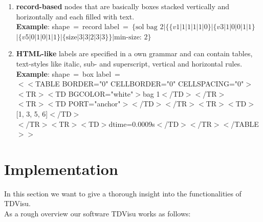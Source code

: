 \documentclass[a4paper, 12pt, bibliography=totoc]{scrartcl}
\begin{document}
\begin{itemize}
\begin{enumerate}[label=(\arabic*)]
		\item \textbf{record-based} nodes that are basically boxes stacked vertically and horizontally and each filled with text.\vspace{10pt}\\
		\textbf{Example}: shape~=~record label~=~$\{\text{sol bag 2}|\{\{v1|1|1|1|1|0\}|\{v3|1|0|0|1|1\}$ \\
		\hspace*{0pt}\hfill $|\{v5|0|1|0|1|1\}|
		\{\text{size}|3|3|2|3|3\}\}|\text{min-size: 2}\}$
		
		\item \textbf{HTML-like} labels are specified in a own grammar and can contain tables, text-styles like italic, sub- and superscript, vertical and horizontal rules.\vspace{10pt}\\		
		\textbf{Example}: shape~=~box label~=\vspace{5pt}\\
		$<<$TABLE BORDER="0" CELLBORDER="0" CELLSPACING="0"$>$\\
		$<$TR$><$TD BGCOLOR="white"$>$bag 1$<$/TD$><$/TR$>$\\
		$<$TR$><$TD PORT="anchor"$>$$<$/TD$><$/TR$><$TR$><$TD$>$[1, 3, 5, 6]$<$/TD$>$\\ $<$/TR$><$TR$><$TD$>$dtime=0.0009s$<$/TD$><$/TR$><$/TABLE$>>$
	\end{enumerate}
\end{itemize}


\newpage
\section{Implementation}\label{sec:project}

In this section we want to give a thorough insight into the functionalities of TDVisu.\\

\noindent As a rough overview our software TDVisu works as follows:
\end{document}
